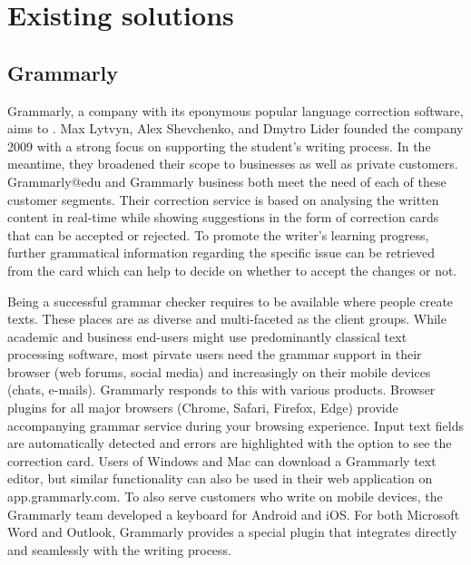 \documentclass[runningheads]{llncs}
\let\OldTextregistered\textregistered
\renewcommand{\textregistered}{\OldTextregistered\xspace}%
\begin{document}

\section{Existing solutions}
\subsection{Grammarly\textregistered}
Grammarly\textregistered, a company with its eponymous popular language correction software, aims to . Max Lytvyn, Alex Shevchenko, and Dmytro Lider founded the company 2009 with a strong focus on supporting the student's writing process. In the meantime, they broadened their scope to businesses as well as private customers. Grammarly\textregistered @edu and Grammarly\textregistered business both meet the need of each of these customer segments. Their correction service is based on analysing the written content in real-time while showing suggestions in the form of correction cards that can be accepted or rejected. To promote the writer's learning progress, further grammatical information regarding the specific issue can be retrieved from the card which can help to decide on whether to accept the changes or not. \citep{noauthor_write_nodate}

Being a successful grammar checker requires to be available where people create texts. These places are as diverse and multi-faceted as the client groups. While academic and business end-users might use predominantly classical text processing software, most pirvate users need the grammar support in their browser (web forums, social media) and increasingly on their mobile devices (chats, e-mails). Grammarly\textregistered responds to this with various products. Browser plugins for all major browsers (Chrome, Safari, Firefox, Edge) provide accompanying grammar service during your browsing experience. Input text fields are automatically detected and errors are highlighted with the option to see the correction card. Users of Windows and Mac can download a Grammarly\textregistered text editor, but similar functionality can also be used in their web application on app.grammarly.com. To also serve customers who write on mobile devices, the Grammarly\textregistered team developed a keyboard for Android and iOS. For both Microsoft Word and Outlook, Grammarly\textregistered provides a special plugin that integrates directly and seamlessly with the writing process.
\end{document}
